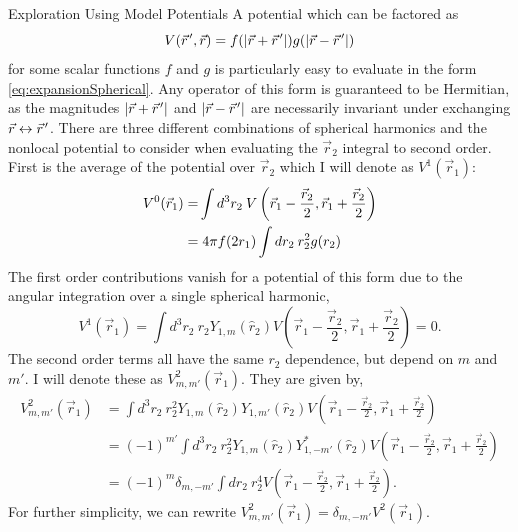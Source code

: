 \begin{section}{Exploration Using Model Potentials\label{sec:toyModel}}
A potential which can be factored as 
\begin{equation}
V(\vec{r}\mkern2mu',\vec{r})=f(|\vec{r}+\vec{r}\mkern2mu'|)g(|\vec{r}-\vec{r}\mkern2mu'|)
\end{equation}
for some scalar functions $f$ and $g$ is particularly easy to evaluate in the form \eqref{eq:expansionSpherical}. Any operator of this form is guaranteed to be Hermitian, as the magnitudes $|\vec{r}+\vec{r}\mkern2mu'|$ and $|\vec{r}-\vec{r}\mkern2mu'|$ are necessarily invariant under exchanging $\vec{r} \leftrightarrow \vec{r}\mkern2mu'$. There are three different combinations of spherical harmonics and the nonlocal potential to consider when evaluating the $\vec{r}_2$ integral to second order. First is the average of the potential over $\vec{r}_2$ which I will denote as $V^1(\vec{r}_1)$:
\begin{equation}\label{eq:V0}
\begin{split}
V^0(\vec{r}_1)=&\int d^3r_2\: V\left(\vec{r}_1-\frac{\vec{r}_2}{2},\vec{r}_1+\frac{\vec{r}_2}{2}\right) \\
=&\hspace{.1cm}4\pi f(2r_1) \int dr_2\: r_2^2 g(r_2)
\end{split}
\end{equation}
The first order contributions vanish for a potential of this form due to the angular integration over a single spherical harmonic,
\begin{equation}\label{eq:V1}
V^1(\vec{r}_1)=\int d^3r_2\:  r_2Y_{1,m}(\hat{r}_2)V\left(\vec{r}_1-\frac{\vec{r}_2}{2},\vec{r}_1+\frac{\vec{r}_2}{2}\right)=0.
\end{equation}
The second order terms all have the same $r_2$ dependence, but depend on $m$ and $m'$. I will denote these as $V^2_{m,m'}(\vec{r}_1)$. They are given by,
\begin{equation}\begin{split}
\label{eq:V2}
V^2_{m,m'}(\vec{r}_1)&=\int d^3r_2\: r_2^2Y_{1,m}(\hat{r}_2)Y_{1,m'}(\hat{r}_2)V\left(\vec{r}_1-\frac{\vec{r}_2}{2},\vec{r}_1+\frac{\vec{r}_2}{2}\right) \\
&=(-1)^{m'}\int d^3r_2\: r_2^2Y_{1,m}(\hat{r}_2)Y^*_{1,-m'}(\hat{r}_2)V\left(\vec{r}_1-\frac{\vec{r}_2}{2},\vec{r}_1+\frac{\vec{r}_2}{2}\right)\\
&=(-1)^m\delta_{m,-m'}\int d r_2 \:r_2^4 V\left(\vec{r}_1-\frac{\vec{r}_2}{2},\vec{r}_1+\frac{\vec{r}_2}{2}\right).
\end{split}
\end{equation}
For further simplicity, we can rewrite $V^2_{m,m'}(\vec{r}_1)=\delta_{m,-m'}V^2(\vec{r}_1)$.


\end{section}

